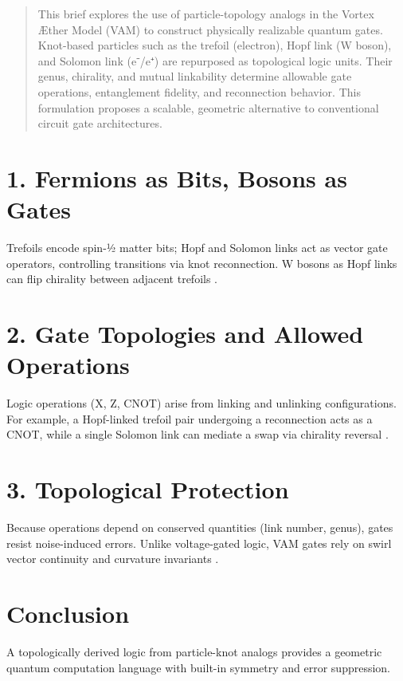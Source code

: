 \documentclass[a4paper,12pt]{article}
\begin{document}
\begin{abstract}
This brief explores the use of particle-topology analogs in the Vortex Æther Model (VAM) to construct physically realizable quantum gates. Knot-based particles such as the trefoil (electron), Hopf link (W boson), and Solomon link (e⁻/e⁺) are repurposed as topological logic units. Their genus, chirality, and mutual linkability determine allowable gate operations, entanglement fidelity, and reconnection behavior. This formulation proposes a scalable, geometric alternative to conventional circuit gate architectures.
\end{abstract}


\section*{1. Fermions as Bits, Bosons as Gates}
Trefoils encode spin-½ matter bits; Hopf and Solomon links act as vector gate operators, controlling transitions via knot reconnection. W bosons as Hopf links can flip chirality between adjacent trefoils \cite{Iskandarani2025,Penrose2004}.

\section*{2. Gate Topologies and Allowed Operations}
Logic operations (X, Z, CNOT) arise from linking and unlinking configurations. For example, a Hopf-linked trefoil pair undergoing a reconnection acts as a CNOT, while a single Solomon link can mediate a swap via chirality reversal \cite{Berloff2014,Hall2016}.

\section*{3. Topological Protection}
Because operations depend on conserved quantities (link number, genus), gates resist noise-induced errors. Unlike voltage-gated logic, VAM gates rely on swirl vector continuity and curvature invariants \cite{Kauffman1991}.

\section*{Conclusion}
A topologically derived logic from particle-knot analogs provides a geometric quantum computation language with built-in symmetry and error suppression.



\end{document}

